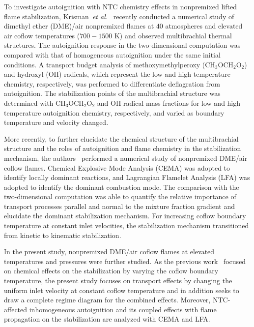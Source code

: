 \documentclass[review,3p,times]{elsarticle}
\begin{document}
To investigate autoignition with NTC chemistry effects in nonpremixed lifted flame stabilization, Krisman~\emph{et al.}~\cite{krisman14} recently conducted a numerical study of dimethyl ether (DME)/air nonpremixed flames at $40$ atmospheres and elevated air coflow temperatures ($700-1500$ K) and observed multibrachial thermal structures.  The autoignition response in the two-dimensional computation was compared with that of homogeneous autoignition under the same initial conditions.  A transport budget analysis of methoxymethylperoxy (CH$_3$OCH$_2$O$_2$) and hydroxyl (OH) radicals, which represent the low and high temperature chemistry, respectively, was performed to differentiate deflagration from autoignition.  The stabilization points of the multibrachial structure was determined with CH$_3$OCH$_2$O$_2$ and OH radical mass fractions for low and high temperature autoignition chemistry, respectively, and varied as boundary temperature and velocity changed.

More recently, to further elucidate the chemical structure of the multibrachial structure and the roles of autoignition and flame chemistry in the stabilization mechanism, the authors~\cite{deng15} performed a numerical study of nonpremixed DME/air coflow flames.  Chemical Explosive Mode Analysis (CEMA) was adopted to identify locally dominant reactions, and Lagrangian Flamelet Analysis (LFA) was adopted to identify the dominant combustion mode.  The comparison with the two-dimensional computation was able to quantify the relative importance of transport processes parallel and normal to the mixture fraction gradient and elucidate the dominant stabilization mechanism.  For increasing coflow boundary temperature at constant inlet velocities, the stabilization mechanism transitioned from kinetic to kinematic stabilization.

In the present study, nonpremixed DME/air coflow flames at elevated temperatures and pressures were further studied.  As the previous work~\cite{deng15} focused on chemical effects on the stabilization by varying the coflow boundary temperature, the present study focuses on transport effects by changing the uniform inlet velocity at constant coflow temperature and in addition seeks to draw a complete regime diagram for the combined effects.  Moreover, NTC-affected inhomogeneous autoignition and its coupled effects with flame propagation on the stabilization are analyzed with CEMA and LFA.  

 
\end{document}
